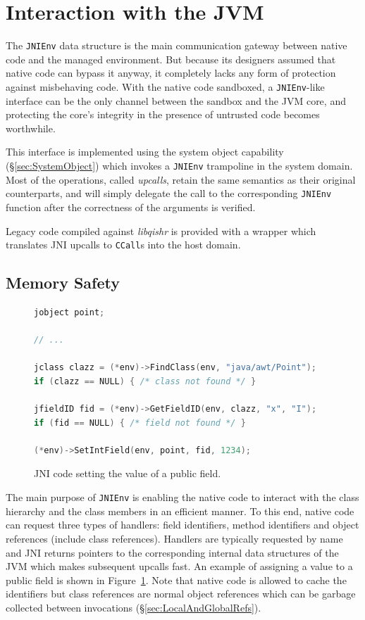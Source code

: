 \documentclass[a4paper,12pt,twoside,openright]{report}
\newcommand{\insn}[1]{\texttt{#1}}
\newcommand{\keyword}[1]{\textsf{#1}}
\newcommand{\tool}[1]{\emph{#1}}
\newcommand{\lib}[1]{\tool{lib#1}}
\begin{document}
\section{Interaction with the JVM}

The \texttt{JNIEnv} data structure is the main communication gateway between native code and the managed environment. But because its designers assumed that native code can bypass it anyway, it completely lacks any form of protection against misbehaving code. With the native code sandboxed, a \texttt{JNIEnv}-like interface can be the only channel between the sandbox and the JVM core, and protecting the core's integrity in the presence of untrusted code becomes worthwhile.

This interface is implemented using the system object capability (\S\ref{sec:SystemObject}) which invokes a \texttt{JNIEnv} trampoline in the system domain. Most of the operations, called \emph{upcalls}, retain the same semantics as their original counterparts, and will simply delegate the call to the corresponding \texttt{JNIEnv} function after the correctness of the arguments is verified. 

Legacy code compiled against \lib{qishr} is provided with a wrapper which translates JNI upcalls to \insn{CCall}s into the host domain.

\subsection{Memory Safety}
\label{sec:MemorySafety}

\begin{figure}[t]
	\begin{lstlisting}[language=C]
jobject point;

// ...

jclass clazz = (*env)->FindClass(env, "java/awt/Point");
if (clazz == NULL) { /* class not found */ }

jfieldID fid = (*env)->GetFieldID(env, clazz, "x", "I");
if (fid == NULL) { /* field not found */ }

(*env)->SetIntField(env, point, fid, 1234);
	\end{lstlisting}
	\caption{JNI code setting the value of a public field.}
	\label{listing:SetFieldValue}
\end{figure}

The main purpose of \texttt{JNIEnv} is enabling the native code to interact with the class hierarchy and the class members in an efficient manner. To this end, native code can request three types of handlers: field identifiers, method identifiers and object references (include class references). Handlers are typically requested by name and JNI returns pointers to the corresponding internal data structures of the JVM which makes subsequent upcalls fast. An example of assigning a value to a \keyword{public} field is shown in Figure~\ref{listing:SetFieldValue}. Note that native code is allowed to cache the identifiers but class references are normal object references which can be garbage collected between invocations (\S\ref{sec:LocalAndGlobalRefs}). 
\end{document}
